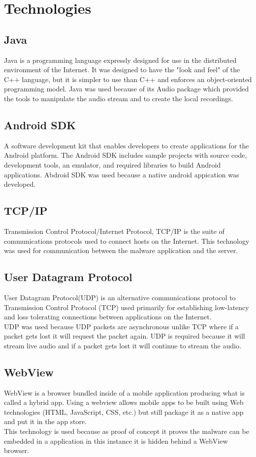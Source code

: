 \section{Technologies}


\subsection{Java}
Java is a programming language expressly designed for use in the distributed environment of the Internet. It was designed to have the "look and feel" of the C++ language, but it is simpler to use than C++ and enforces an object-oriented programming model.
Java was used because of its Audio package which provided the tools to manipulate the audio stream and to create the local recordings. 

\subsection{Android SDK}
A software development kit that enables developers to create applications for the Android platform. The Android SDK includes sample projects with source code, development tools, an emulator, and required libraries to build Android applications.
Abdroid SDK was used because a native android appication was developed.
\subsection{TCP/IP}
Transmission Control Protocol/Internet Protocol, TCP/IP is the suite of communications protocols used to connect hosts on the Internet.
This technology was used for communication between the malware application and the server.

\subsection{User Datagram Protocol}
User Datagram Protocol(UDP) is an alternative communications protocol to Transmission Control Protocol (TCP) used primarily for establishing low-latency and loss tolerating connections between applications on the Internet.\\UDP was used because UDP packets are asynchronous unlike TCP where if a packet gets lost it will request the packet again. UDP is required because it will stream live audio and if a packet gets lost it will continue to stream the audio.

\subsection{WebView}
WebView is a browser bundled inside of a mobile application producing what is called a hybrid app. Using a webview allows mobile apps to be built using Web technologies (HTML, JavaScript, CSS, etc.) but still package it as a native app and put it in the app store. 
\\This technology is used because as proof of concept it proves the malware can be embedded in a application in this instance it is hidden behind a WebView browser.